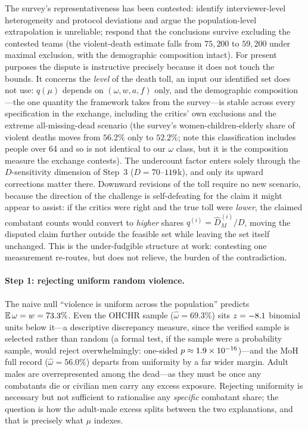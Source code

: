 The survey's representativeness has been contested: \citet{dellapergola2026} identify interviewer-level heterogeneity and protocol deviations and argue the population-level extrapolation is unreliable; \citet{spagatreply2026} respond that the conclusions survive excluding the contested teams (the violent-death estimate falls from $75{,}200$ to $59{,}200$ under maximal exclusion, with the demographic composition intact). For present purposes the dispute is instructive precisely because it does not touch the bounds. It concerns the \emph{level} of the death toll, an input our identified set does not use: $q(\mu)$ depends on $(\omega,w,a,f)$ only, and the demographic composition---the one quantity the framework takes from the survey---is stable across every specification in the exchange, including the critics' own exclusions and the extreme all-missing-dead scenario (the survey's women-children-elderly share of violent deaths moves from $56.2\%$ only to $52.2\%$; note this classification includes people over 64 and so is not identical to our $\omega$ class, but it is the composition measure the exchange contests). The undercount factor enters solely through the $D$-sensitivity dimension of Step~3 ($D=70$--$119{}$k), and only its upward corrections matter there. Downward revisions of the toll require no new scenario, because the direction of the challenge is self-defeating for the claim it might appear to assist: if the critics were right and the true toll were \emph{lower}, the claimed combatant counts would convert to \emph{higher} shares $q^{(i)}=\hat D_M^{(i)}/D$, moving the disputed claim further outside the feasible set while leaving the set itself unchanged. This is the under-fudgible structure at work: contesting one measurement re-routes, but does not relieve, the burden of the contradiction.

\paragraph{Step 1: rejecting uniform random violence.} The naive null ``violence is uniform across the population'' predicts $\mathbb{E}\,\omega=w=73.3\%$. Even the OHCHR sample ($\hat\omega=69.3\%$) sits $z=-8.1{}$ binomial units below it---a descriptive discrepancy measure, since the verified sample is selected rather than random (a formal test, if the sample were a probability sample, would reject overwhelmingly: one-sided $p\approx 1.9\times 10^{-16}{}$)---and the MoH full record ($\hat\omega=56.0\%$) departs from uniformity by a far wider margin. Adult males are overrepresented among the dead---as they must be once any combatants die or civilian men carry any excess exposure. Rejecting uniformity is necessary but not sufficient to rationalise any \emph{specific} combatant share; the question is how the adult-male excess splits between the two explanations, and that is precisely what $\mu$ indexes.

